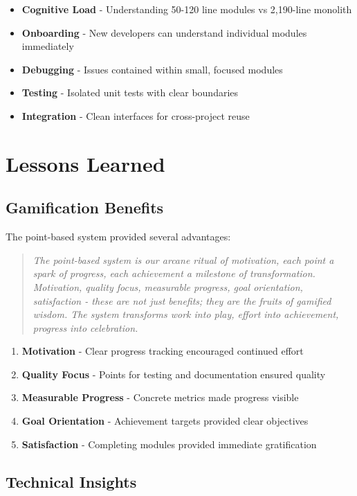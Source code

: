 \documentclass[11pt]{article}
\begin{document}
\begin{itemize}
\item \textbf{Cognitive Load} - Understanding 50-120 line modules vs 2,190-line monolith
\item \textbf{Onboarding} - New developers can understand individual modules immediately
\item \textbf{Debugging} - Issues contained within small, focused modules
\item \textbf{Testing} - Isolated unit tests with clear boundaries
\item \textbf{Integration} - Clean interfaces for cross-project reuse
\end{itemize}

\section{Lessons Learned}

\subsection{Gamification Benefits}

The point-based system provided several advantages:

\begin{quote}
\emph{The point-based system is our arcane ritual of motivation, each point a spark of progress, each achievement a milestone of transformation. Motivation, quality focus, measurable progress, goal orientation, satisfaction - these are not just benefits; they are the fruits of gamified wisdom. The system transforms work into play, effort into achievement, progress into celebration.}
\end{quote}

\begin{enumerate}
\item \textbf{Motivation} - Clear progress tracking encouraged continued effort
\item \textbf{Quality Focus} - Points for testing and documentation ensured quality
\item \textbf{Measurable Progress} - Concrete metrics made progress visible
\item \textbf{Goal Orientation} - Achievement targets provided clear objectives
\item \textbf{Satisfaction} - Completing modules provided immediate gratification
\end{enumerate}

\subsection{Technical Insights}
\end{document}
